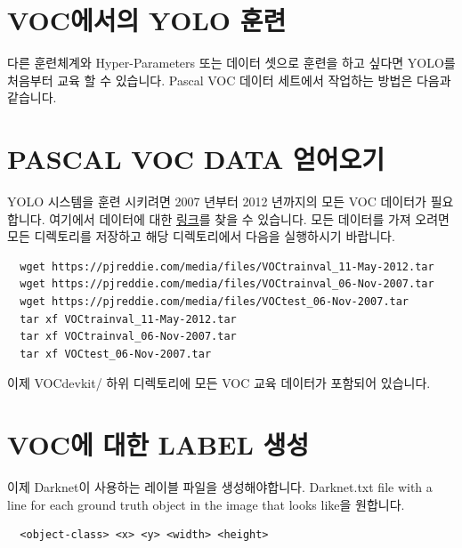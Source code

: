 \documentclass{article}
\begin{document}
\section{VOC에서의 YOLO 훈련}
다른 훈련체계와 Hyper-Parameters 또는 데이터 셋으로 훈련을 하고 싶다면 YOLO를 처음부터 교육 할 수 있습니다. Pascal VOC 데이터 세트에서 작업하는 방법은 다음과 같습니다.

\section{PASCAL VOC DATA 얻어오기}
YOLO 시스템을 훈련 시키려면 2007 년부터 2012 년까지의 모든 VOC 데이터가 필요합니다. 
여기에서 데이터에 대한  \href{http://khseob0715.dothome.co.kr/YOLO/here.html}{링크}를 찾을 수 있습니다. 
모든 데이터를 가져 오려면 모든 디렉토리를 저장하고 해당 디렉토리에서 다음을 실행하시기 바랍니다.
\begin{lstlisting}
  wget https://pjreddie.com/media/files/VOCtrainval_11-May-2012.tar 
  wget https://pjreddie.com/media/files/VOCtrainval_06-Nov-2007.tar 
  wget https://pjreddie.com/media/files/VOCtest_06-Nov-2007.tar 
  tar xf VOCtrainval_11-May-2012.tar 
  tar xf VOCtrainval_06-Nov-2007.tar 
  tar xf VOCtest_06-Nov-2007.tar 
\end{lstlisting}
이제 VOCdevkit/ 하위 디렉토리에 모든 VOC 교육 데이터가 포함되어 있습니다.

\section{VOC에 대한 LABEL 생성}
이제 Darknet이 사용하는 레이블 파일을 생성해야합니다. 
Darknet.txt file with a line for each ground truth object in the image that looks like을 원합니다.
\begin{lstlisting}
  <object-class> <x> <y> <width> <height> 
\end{lstlisting}
\end{document}
